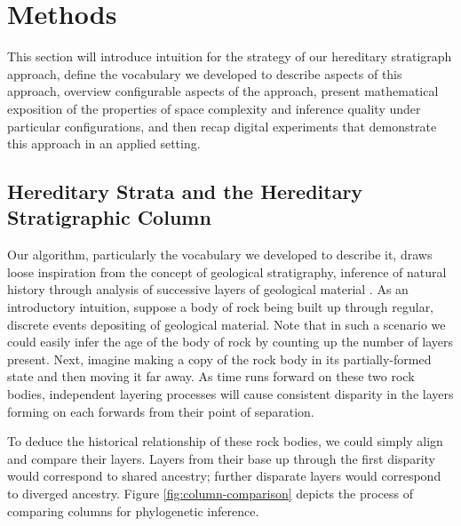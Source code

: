 \section{Methods} \label{sec:methods}

This section will introduce intuition for the strategy of our hereditary stratigraph approach, define the vocabulary we developed to describe aspects of this approach, overview configurable aspects of the approach, present mathematical exposition of the properties of space complexity and inference quality under particular configurations, and then recap digital experiments that demonstrate this approach in an applied setting.

\subsection{Hereditary Strata and the Hereditary Stratigraphic Column}



Our algorithm, particularly the vocabulary we developed to describe it, draws loose inspiration from the concept of geological stratigraphy, inference of natural history through analysis of successive layers of geological material \citep{steno1916prodromus}.
As an introductory intuition, suppose a body of rock being built up through regular, discrete events depositing of geological material.
Note that in such a scenario we could easily infer the age of the body of rock by counting up the number of layers present.
Next, imagine making a copy of the rock body in its partially-formed state and then moving it far away.
As time runs forward on these two rock bodies, independent layering processes will cause consistent disparity in the layers forming on each forwards from their point of separation.

To deduce the historical relationship of these rock bodies, we could simply align and compare their layers.
Layers from their base up through the first disparity would correspond to shared ancestry; further disparate layers would correspond to diverged ancestry.
Figure \ref{fig:column-comparison} depicts the process of comparing columns for phylogenetic inference.

